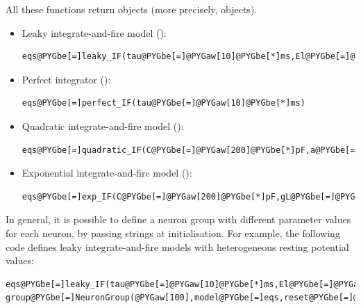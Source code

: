 \documentclass[letterpaper,10pt]{manual}
\begin{document}
All these functions return \hyperlink{brian.Equations}{} objects (more precisely,  objects).
\begin{itemize}
\item {} 
Leaky integrate-and-fire model ():

\begin{Verbatim}[commandchars=@\[\]]
eqs@PYGbe[=]leaky_IF(tau@PYGbe[=]@PYGaw[10]@PYGbe[*]ms,El@PYGbe[=]@PYGbe[-]@PYGaw[70]@PYGbe[*]mV)
\end{Verbatim}

\item {} 
Perfect integrator ():

\begin{Verbatim}[commandchars=@\[\]]
eqs@PYGbe[=]perfect_IF(tau@PYGbe[=]@PYGaw[10]@PYGbe[*]ms)
\end{Verbatim}

\item {} 
Quadratic integrate-and-fire model ():

\begin{Verbatim}[commandchars=@\[\]]
eqs@PYGbe[=]quadratic_IF(C@PYGbe[=]@PYGaw[200]@PYGbe[*]pF,a@PYGbe[=]@PYGaw[10]@PYGbe[*]nS@PYGbe[/]mV,EL@PYGbe[=]@PYGbe[-]@PYGaw[70]@PYGbe[*]mV,VT@PYGbe[=]@PYGbe[-]@PYGaw[50]@PYGbe[*]mV)
\end{Verbatim}

\item {} 
Exponential integrate-and-fire model ():

\begin{Verbatim}[commandchars=@\[\]]
eqs@PYGbe[=]exp_IF(C@PYGbe[=]@PYGaw[200]@PYGbe[*]pF,gL@PYGbe[=]@PYGaw[10]@PYGbe[*]nS,EL@PYGbe[=]@PYGbe[-]@PYGaw[70]@PYGbe[*]mV,VT@PYGbe[=]@PYGbe[-]@PYGaw[55]@PYGbe[*]mV,DeltaT@PYGbe[=]@PYGaw[3]@PYGbe[*]mV)
\end{Verbatim}

\end{itemize}

In general, it is possible to define a neuron group with different parameter values for each neuron, by
passing strings at initialisation. For example, the following code defines leaky integrate-and-fire models
with heterogeneous resting potential values:

\begin{Verbatim}[commandchars=@\[\]]
eqs@PYGbe[=]leaky_IF(tau@PYGbe[=]@PYGaw[10]@PYGbe[*]ms,El@PYGbe[=]@PYGad[']@PYGad[V0]@PYGad['])@PYGbe[+]Equations(@PYGad[']@PYGad[V0:volt]@PYGad['])
group@PYGbe[=]NeuronGroup(@PYGaw[100],model@PYGbe[=]eqs,reset@PYGbe[=]@PYGaw[0]@PYGbe[*]mV,threshold@PYGbe[=]@PYGaw[15]@PYGbe[*]mV)
\end{Verbatim}
\end{document}
